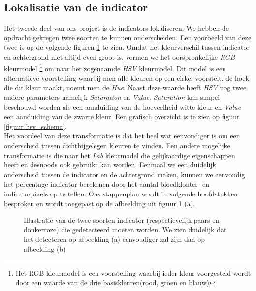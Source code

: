 \documentclass[a4paper,kulak]{kulakarticle}
\begin{document}
\subsection{Lokalisatie van de indicator}
Het tweede deel van ons project is de indicators lokaliseren. We hebben de opdracht gekregen twee soorten te kunnen onderscheiden. Een voorbeeld van deze twee is op de volgende figuren \ref{figuur indicators} te zien. Omdat het kleurverschil tussen indicator en achtergrond niet altijd even groot is, vormen we het oorspronkelijke \textit{RGB} kleurmodel \footnote{Het RGB kleurmodel is een voorstelling waarbij ieder kleur voorgesteld wordt door een waarde van de drie basiskleuren(rood, groen en blauw)} om naar het zogenaamde \textit{HSV} kleurmodel. Dit model is een alternatieve voorstelling waarbij men alle kleuren op een cirkel voorstelt, de hoek die dit kleur maakt, noemt men de \textit{Hue}. Naast deze waarde heeft \textit{HSV} nog twee andere parameters namelijk \textit{Saturation} en \textit{Value}. \textit{Saturation} kan simpel beschouwd worden als een aanduiding van de hoeveelheid witte kleur en \textit{Value} een aanduiding van de zwarte kleur. Een grafisch overzicht is te zien op figuur \ref{figuur hsv_schema}.\\
Het voordeel van deze transformatie is dat het heel wat eenvoudiger is om een onderscheid tussen dichtbijgelegen kleuren te vinden. Een andere mogelijke transformatie is die naar het \textit{Lab} kleurmodel die gelijkaardige eigenschappen heeft en desnoods ook gebruikt kan worden. Eenmaal we een duidelijk onderscheid tussen de indicator en de achtergrond maken, kunnen we eenvoudig het percentage indicator berekenen door het aantal bloedklonter- en indicatorpixels op te tellen. Ons stappenplan wordt in volgende hoofdstukken besproken en wordt toegepast op de afbeelding uit figuur \ref{figuur indicators} (a).
\begin{figure}[H]
	\centering
	\qquad
	
	\caption{Illustratie van de twee soorten indicator (respectievelijk paars en donkerroze) die gedetecteerd moeten worden. We zien duidelijk dat het detecteren op afbeelding (a) eenvoudiger zal zijn dan op afbeelding (b)}
	\label{figuur indicators}
\end{figure}
\end{document}
